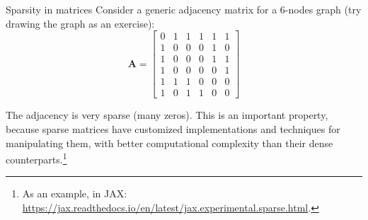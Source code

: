 \begin{supportbox}{Sparsity in matrices}
Consider a generic adjacency matrix for a $6$-nodes graph (try drawing the graph as an exercise):
%
$$
\mathbf{A} = \begin{bmatrix} 0& 1& 1& 1& 1& 1\\1& 0& 0& 0& 1& 0\\1& 0& 0& 0& 1& 1\\1& 0& 0& 0& 0& 1\\1& 1& 1& 0& 0& 0\\1& 0& 1& 1& 0& 0\end{bmatrix}
$$

The adjacency is very sparse (many zeros). This is an important property, because sparse matrices have customized implementations and techniques for manipulating them, with better computational complexity than their dense counterparts.\footnote{As an example, in JAX: \url{https://jax.readthedocs.io/en/latest/jax.experimental.sparse.html}.}
\end{supportbox}

